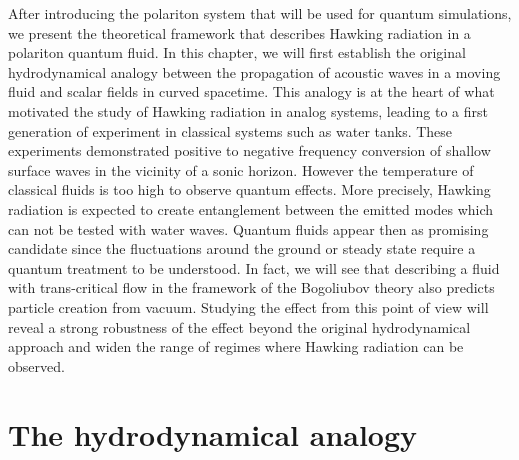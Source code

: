 After introducing the polariton system that will be used for quantum simulations, we present the theoretical framework that  
describes Hawking radiation in a polariton quantum fluid. In this chapter, we will first establish the original hydrodynamical analogy between the propagation 
of acoustic waves in a moving fluid and scalar fields in curved spacetime. This analogy is at the heart of what motivated the study 
of Hawking radiation in analog systems, leading to a first generation of experiment in classical systems such as water tanks. These experiments
\cite{rousseaux_observation_2008,weinfurtner_measurement_2011} demonstrated positive to negative frequency conversion of shallow surface waves in the vicinity of a sonic horizon. However the temperature
of classical fluids is too high to observe quantum effects. More precisely, Hawking radiation is expected to create entanglement between the emitted modes which can not be tested with water waves. 
Quantum fluids appear then as promising candidate since the 
fluctuations around the ground or steady state require a quantum treatment to be understood. In fact, we will see that describing a fluid with trans-critical flow in the framework of the Bogoliubov theory also predicts particle creation from vacuum. Studying the effect from this point of view will reveal a strong robustness 
of the effect beyond the original hydrodynamical approach and widen the range of regimes where Hawking radiation can be observed.


\section{The hydrodynamical analogy}

